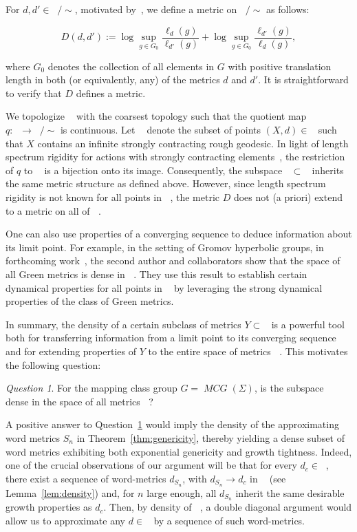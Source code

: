 \documentclass{amsart}
\numberwithin{thm}{section}
\numberwithin{figure}{section}
\theoremstyle{definition}
\theoremstyle{definition}
\theoremstyle{remark}
\newtheorem{quest}[thm]{Question}
\numberwithin{equation}{section}
\DeclareMathOperator{\MCG}{\mathit{MCG}}
\DeclareMathOperator{\DDG}{\mathcal{D}(G)}
\DeclareMathOperator{\DDGS}{\mathcal{D}_{s}(G)}
\theoremstyle{plain}
\begin{document}
For $d, d' \in \DDG / \sim$, motivated by~\cite{Fur02:Coarse,OR22:SpaceMetric}, we define a metric on $\DDG / \sim$ as follows:

\[
D(d, d') := \log \sup_{g \in G_0} \frac{\ell_d(g)}{\ell_{d'}(g)} + \log \sup_{g \in G_0} \frac{\ell_{d'}(g)}{\ell_d(g)},
\]

where $G_0$ denotes the collection of all elements in $G$ with positive translation length in both (or equivalently, any) of the metrics $d$ and $d'$. It is straightforward to verify that $D$ defines a metric.

We topologize $\DDG$ with the coarsest topology such that the quotient map $q: \DDG \to \DDG / \sim$ is continuous. Let $\DDGS$ denote the subset of points $(X, d) \in \DDG$ such that $X$ contains an infinite strongly contracting rough geodesic. In light of length spectrum rigidity for actions with strongly contracting elements~\cite{W24:Marked}, the restriction of $q$ to $\DDGS$ is a bijection onto its image. Consequently, the subspace $\DDGS \subset \DDG$ inherits the same metric structure as defined above. However, since length spectrum rigidity is not known for all points in $\DDG$, the metric $D$ does not (a priori) extend to a metric on all of $\DDG$.









One can also use properties of a converging sequence to deduce information about its limit point. For example, in the setting of Gromov hyperbolic groups, in forthcoming work~\cite{CMGR:GreenDensity}, the second author and collaborators show that the space of all Green metrics is dense in $\DDG$. They use this result to establish certain dynamical properties for all points in $\DDG$ by leveraging the strong dynamical properties of the class of Green metrics.

In summary, the density of a certain subclass of metrics $Y \subset \DDG$ is a powerful tool both for transferring information from a limit point to its converging sequence and for extending properties of $Y$ to the entire space of metrics $\DDG$. This motivates the following question:

\begin{quest}
For the mapping class group $G = \MCG(\Sigma)$, is the subspace $\DDGS$ dense in the space of all metrics $\DDG$?
\label{que:densityinjective}
\end{quest}

A positive answer to Question~\ref{que:densityinjective} would imply the density of the approximating word metrics $S_n$ in Theorem~\ref{thm:genericity}, thereby yielding a dense subset of word metrics exhibiting both exponential genericity and growth tightness. Indeed, one of the crucial observations of our argument will be that for every $d_c \in \DDGS$, there exist a sequence of word-metrics $d_{S_n}$, with $d_{S_n} \to d_c$ in $\DDG$ (see Lemma~\ref{lem:density}) and, for $n$ large enough, all $d_{S_n}$ inherit the same desirable growth properties as $d_c$. Then, by density of $\DDGS$, a double diagonal argument would allow us to approximate any $d \in \DDG$ by a sequence of such word-metrics.
\end{document}
